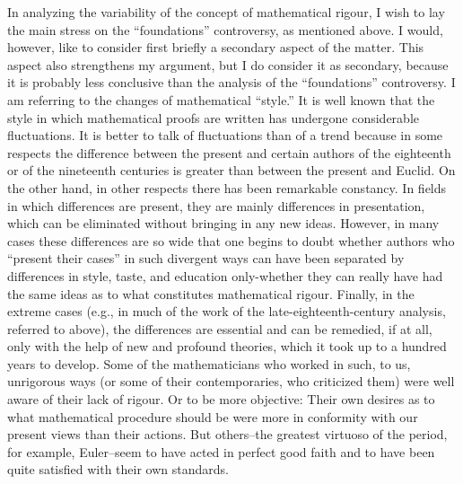 \documentclass{article}
\begin{document}
In analyzing the variability of the concept of mathematical rigour, I wish to lay the main stress on the ``foundations'' controversy, as mentioned above. I would, however, like to consider first briefly a secondary aspect of the matter. This aspect also strengthens my argument, but I do consider it as secondary, because it is probably less conclusive than the analysis of the ``foundations'' controversy. I am referring to the changes of mathematical ``style.'' It is well known that the style in which mathematical proofs are written has undergone considerable fluctuations. It is better to talk of fluctuations than of a trend because in some respects the difference between the present and certain authors of the eighteenth or of the nineteenth centuries is greater than between the present and Euclid. On the other hand, in other respects there has been remarkable constancy. In fields in which differences are present, they are mainly differences in presentation, which can be eliminated without bringing in any new ideas. However, in many cases these differences are so wide that one begins to doubt whether authors who ``present their cases'' in such divergent ways can have been separated by differences in style, taste, and education only-whether they can really have had the same ideas as to what constitutes mathematical rigour. Finally, in the extreme cases (e.g., in much of the work of the late-eighteenth-century analysis, referred to above), the differences are essential and can be remedied, if at all, only with the help of new and profound theories, which it took up to a hundred years to develop. Some of the mathematicians who worked in such, to us, unrigorous ways (or some of their contemporaries, who criticized them) were well aware of their lack of rigour. Or to be more objective: Their own desires as to what mathematical procedure should be were more in conformity with our present views than their actions. But others--the greatest virtuoso of the period, for example, Euler--seem to have acted in perfect good faith and to have been quite satisfied with their own standards.
\end{document}
